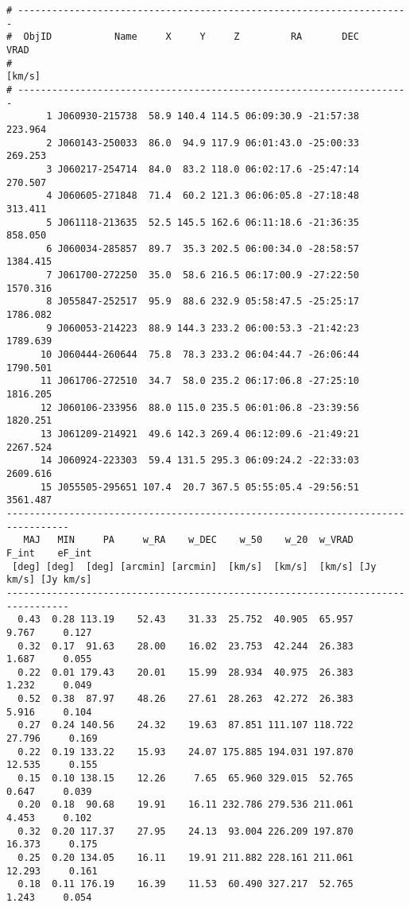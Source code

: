 {\footnotesize
\begin{verbatim}
# ---------------------------------------------------------------------
#  ObjID           Name     X     Y     Z         RA       DEC     VRAD
#                                                                [km/s]
# ---------------------------------------------------------------------
       1 J060930-215738  58.9 140.4 114.5 06:09:30.9 -21:57:38  223.964
       2 J060143-250033  86.0  94.9 117.9 06:01:43.0 -25:00:33  269.253
       3 J060217-254714  84.0  83.2 118.0 06:02:17.6 -25:47:14  270.507
       4 J060605-271848  71.4  60.2 121.3 06:06:05.8 -27:18:48  313.411
       5 J061118-213635  52.5 145.5 162.6 06:11:18.6 -21:36:35  858.050
       6 J060034-285857  89.7  35.3 202.5 06:00:34.0 -28:58:57 1384.415
       7 J061700-272250  35.0  58.6 216.5 06:17:00.9 -27:22:50 1570.316
       8 J055847-252517  95.9  88.6 232.9 05:58:47.5 -25:25:17 1786.082
       9 J060053-214223  88.9 144.3 233.2 06:00:53.3 -21:42:23 1789.639
      10 J060444-260644  75.8  78.3 233.2 06:04:44.7 -26:06:44 1790.501
      11 J061706-272510  34.7  58.0 235.2 06:17:06.8 -27:25:10 1816.205
      12 J060106-233956  88.0 115.0 235.5 06:01:06.8 -23:39:56 1820.251
      13 J061209-214921  49.6 142.3 269.4 06:12:09.6 -21:49:21 2267.524
      14 J060924-223303  59.4 131.5 295.3 06:09:24.2 -22:33:03 2609.616
      15 J055505-295651 107.4  20.7 367.5 05:55:05.4 -29:56:51 3561.487
---------------------------------------------------------------------------------
   MAJ   MIN     PA     w_RA    w_DEC    w_50    w_20  w_VRAD     F_int    eF_int
 [deg] [deg]  [deg] [arcmin] [arcmin]  [km/s]  [km/s]  [km/s] [Jy km/s] [Jy km/s]
---------------------------------------------------------------------------------
  0.43  0.28 113.19    52.43    31.33  25.752  40.905  65.957     9.767     0.127
  0.32  0.17  91.63    28.00    16.02  23.753  42.244  26.383     1.687     0.055
  0.22  0.01 179.43    20.01    15.99  28.934  40.975  26.383     1.232     0.049
  0.52  0.38  87.97    48.26    27.61  28.263  42.272  26.383     5.916     0.104
  0.27  0.24 140.56    24.32    19.63  87.851 111.107 118.722    27.796     0.169
  0.22  0.19 133.22    15.93    24.07 175.885 194.031 197.870    12.535     0.155
  0.15  0.10 138.15    12.26     7.65  65.960 329.015  52.765     0.647     0.039
  0.20  0.18  90.68    19.91    16.11 232.786 279.536 211.061     4.453     0.102
  0.32  0.20 117.37    27.95    24.13  93.004 226.209 197.870    16.373     0.175
  0.25  0.20 134.05    16.11    19.91 211.882 228.161 211.061    12.293     0.161
  0.18  0.11 176.19    16.39    11.53  60.490 327.217  52.765     1.243     0.054

\end{verbatim}}
